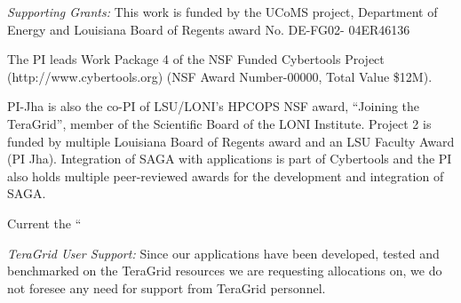 \documentclass[a4paper,10pt]{article}
\begin{document}
{\it Supporting Grants:} This work is funded by the UCoMS project, Department of Energy and Louisiana Board of Regents
award No. DE-FG02- 04ER46136 

The PI leads Work Package 4 of the NSF Funded Cybertools Project
(http://www.cybertools.org) (NSF Award Number-00000, Total Value
\$12M).

PI-Jha is also the co-PI of LSU/LONI's HPCOPS NSF award, ``Joining the TeraGrid'', member of the Scientific Board of the LONI Institute.  Project 2 is funded by multiple Louisiana Board of Regents award and an LSU Faculty Award (PI Jha). Integration of SAGA with applications is part of Cybertools and the PI also holds multiple peer-reviewed awards for the development and integration of SAGA.

Current the ``


{\it TeraGrid User Support:} Since our applications have been developed, tested and benchmarked on the TeraGrid resources
we are requesting allocations on, we do not foresee any need for support from TeraGrid personnel.







\end{document}
